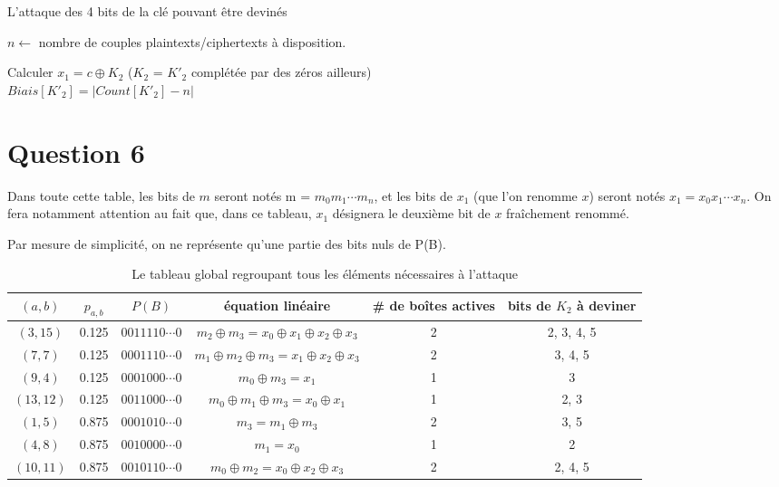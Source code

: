 \begin{algorithm}
\caption{L'attaque des 4 bits de la clé pouvant être devinés}
	$n \longleftarrow $ nombre de couples plaintexts/ciphertexts à disposition. \\
	{
		{
			{
				Calculer $x_1 = c \oplus K_2$ ($K_2$ = $K'_2$ complétée par des zéros ailleurs) \\
			}
		$Biais[K'_2] = | Count[K'_2] - n |$
		}
		
	}
\end{algorithm}

\section*{Question 6}

Dans toute cette table, les bits de $m$ seront notés m = $m_0 m_1\cdots m_n$, et les bits de $x_1$ (que l'on renomme $x$) seront notés $x_1 = x_0 x_1 \cdots x_n$. On fera notamment attention au fait que, dans ce tableau, $x_1$ désignera le deuxième bit de $x$ fraîchement renommé.

Par mesure de simplicité, on ne représente qu'une partie des bits nuls de P(B).

\begin{table}[!ht]
\centering
\begin{small}
\begin{tabular}{|c|c|c|c|c|c|}
	\hline
	$(a,b)$   & $p_{a,b}$ & 		$P(B)$ 	   & équation linéaire	 & \# de boîtes actives & bits de $K_2$ à deviner \\
	\hline
	$(3,15)$  &   0.125   & $0011110\cdots0$ & $m_2 \oplus m_3 = x_0 \oplus x_1 \oplus x_2 \oplus x_3$ & 2 & 2, 3, 4, 5 \\
	\hline
	$(7,7)$   &   0.125   & $0001110\cdots0$ & $m_1 \oplus m_2 \oplus m_3 = x_1 \oplus x_2 \oplus x_3$ & 2 & 3, 4, 5\\
	\hline
	$(9,4)$   &   0.125   & $0001000\cdots0$ & $m_0 \oplus m_3 = x_1$ 								   & 1 & 3 \\
	\hline
	$(13,12)$ &   0.125   & $0011000\cdots0$ & $m_0 \oplus m_1 \oplus m_3 = x_0 \oplus x_1$ 		   & 1 & 2, 3 \\
	\hline
	$(1,5)$   &   0.875   & $0001010\cdots0$ & $m_3 = m_1 \oplus m_3$								   & 2 & 3, 5 \\
	\hline
	$(4,8)$   &   0.875   & $0010000\cdots0$ & $m_1 = x_0$ 											   & 1 & 2 \\
	\hline
	$(10,11)$ &   0.875   & $0010110\cdots0$ & $m_0 \oplus m_2 = x_0 \oplus x_2 \oplus x_3$			   & 2 & 2, 4, 5 \\
	\hline
\end{tabular}
\end{small}
\caption{Le tableau global regroupant tous les éléments nécessaires à l'attaque}
\end{table}

